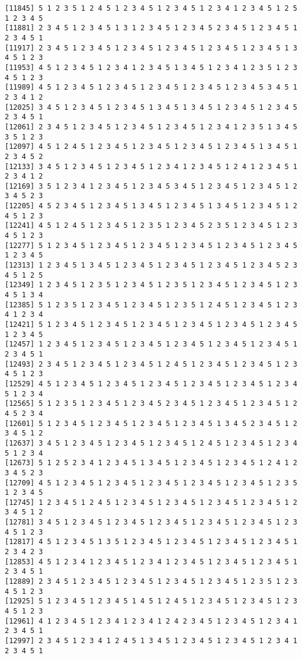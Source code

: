 \documentclass[
  11pt,
]{book}
\begin{document}
\begin{verbatim}
[11845] 5 1 2 3 5 1 2 4 5 1 2 3 4 5 1 2 3 4 5 1 2 3 4 1 2 3 4 5 1 2 5 1 2 3 4 5
[11881] 2 3 4 5 1 2 3 4 5 1 3 1 2 3 4 5 1 2 3 4 5 2 3 4 5 1 2 3 4 5 1 2 3 4 5 1
[11917] 2 3 4 5 1 2 3 4 5 1 2 3 4 5 1 2 3 4 5 1 2 3 4 5 1 2 3 4 5 1 3 4 5 1 2 3
[11953] 4 5 1 2 3 4 5 1 2 3 4 1 2 3 4 5 1 3 4 5 1 2 3 4 1 2 3 5 1 2 3 4 5 1 2 3
[11989] 4 5 1 2 3 4 5 1 2 3 4 5 1 2 3 4 5 1 2 3 4 5 1 2 3 4 5 3 4 5 1 2 3 4 1 2
[12025] 3 4 5 1 2 3 4 5 1 2 3 4 5 1 3 4 5 1 3 4 5 1 2 3 4 5 1 2 3 4 5 2 3 4 5 1
[12061] 2 3 4 5 1 2 3 4 5 1 2 3 4 5 1 2 3 4 5 1 2 3 4 1 2 3 5 1 3 4 5 3 5 1 2 3
[12097] 4 5 1 2 4 5 1 2 3 4 5 1 2 3 4 5 1 2 3 4 5 1 2 3 4 5 1 3 4 5 1 2 3 4 5 2
[12133] 3 4 5 1 2 3 4 5 1 2 3 4 5 1 2 3 4 1 2 3 4 5 1 2 4 1 2 3 4 5 1 2 3 4 1 2
[12169] 3 5 1 2 3 4 1 2 3 4 5 1 2 3 4 5 3 4 5 1 2 3 4 5 1 2 3 4 5 1 2 3 4 5 2 3
[12205] 4 5 2 3 4 5 1 2 3 4 5 1 3 4 5 1 2 3 4 5 1 3 4 5 1 2 3 4 5 1 2 4 5 1 2 3
[12241] 4 5 1 2 4 5 1 2 3 4 5 1 2 3 5 1 2 3 4 5 2 3 5 1 2 3 4 5 1 2 3 4 5 1 2 3
[12277] 5 1 2 3 4 5 1 2 3 4 5 1 2 3 4 5 1 2 3 4 5 1 2 3 4 5 1 2 3 4 5 1 2 3 4 5
[12313] 1 2 3 4 5 1 3 4 5 1 2 3 4 5 1 2 3 4 5 1 2 3 4 5 1 2 3 4 5 2 3 4 5 1 2 5
[12349] 1 2 3 4 5 1 2 3 5 1 2 3 4 5 1 2 3 5 1 2 3 4 5 1 2 3 4 5 1 2 3 4 5 1 3 4
[12385] 5 1 2 3 5 1 2 3 4 5 1 2 3 4 5 1 2 3 5 1 2 4 5 1 2 3 4 5 1 2 3 4 1 2 3 4
[12421] 5 1 2 3 4 5 1 2 3 4 5 1 2 3 4 5 1 2 3 4 5 1 2 3 4 5 1 2 3 4 5 1 2 3 4 5
[12457] 1 2 3 4 5 1 2 3 4 5 1 2 3 4 5 1 2 3 4 5 1 2 3 4 5 1 2 3 4 5 1 2 3 4 5 1
[12493] 2 3 4 5 1 2 3 4 5 1 2 3 4 5 1 2 4 5 1 2 3 4 5 1 2 3 4 5 1 2 3 4 5 1 2 3
[12529] 4 5 1 2 3 4 5 1 2 3 4 5 1 2 3 4 5 1 2 3 4 5 1 2 3 4 5 1 2 3 4 5 1 2 3 4
[12565] 5 1 2 3 5 1 2 3 4 5 1 2 3 4 5 2 3 4 5 1 2 3 4 5 1 2 3 4 5 1 2 4 5 2 3 4
[12601] 5 1 2 3 4 5 1 2 3 4 5 1 2 3 4 5 1 2 3 4 5 1 3 4 5 2 3 4 5 1 2 3 4 5 1 2
[12637] 3 4 5 1 2 3 4 5 1 2 3 4 5 1 2 3 4 5 1 2 4 5 1 2 3 4 5 1 2 3 4 5 1 2 3 4
[12673] 5 1 2 5 2 3 4 1 2 3 4 5 1 3 4 5 1 2 3 4 5 1 2 3 4 5 1 2 4 1 2 3 4 5 2 3
[12709] 4 5 1 2 3 4 5 1 2 3 4 5 1 2 3 4 5 1 2 3 4 5 1 2 3 4 5 1 2 3 5 1 2 3 4 5
[12745] 1 2 3 4 5 1 2 4 5 1 2 3 4 5 1 2 3 4 5 1 2 3 4 5 1 2 3 4 5 1 2 3 4 5 1 2
[12781] 3 4 5 1 2 3 4 5 1 2 3 4 5 1 2 3 4 5 1 2 3 4 5 1 2 3 4 5 1 2 3 4 5 1 2 3
[12817] 4 5 1 2 3 4 5 1 3 5 1 2 3 4 5 1 2 3 4 5 1 2 3 4 5 1 2 3 4 5 1 2 3 4 2 3
[12853] 4 5 1 2 3 4 1 2 3 4 5 1 2 3 4 1 2 3 4 5 1 2 3 4 5 1 2 3 4 5 1 2 3 4 5 1
[12889] 2 3 4 5 1 2 3 4 5 1 2 3 4 5 1 2 3 4 5 1 2 3 4 5 1 2 3 5 1 2 3 4 5 1 2 3
[12925] 5 1 2 3 4 5 1 2 3 4 5 1 4 5 1 2 4 5 1 2 3 4 5 1 2 3 4 5 1 2 3 4 5 1 2 3
[12961] 4 1 2 3 4 5 1 2 3 4 1 2 3 4 1 2 4 2 3 4 5 1 2 3 4 5 1 2 3 4 1 2 3 4 5 1
[12997] 2 3 4 5 1 2 3 4 1 2 4 5 1 3 4 5 1 2 3 4 5 1 2 3 4 5 1 2 3 4 1 2 3 4 5 1

\end{verbatim}
\end{document}
